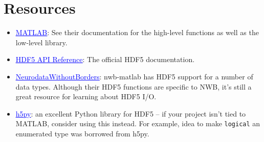 \documentclass[11pt]{exam}
\newcommand\myurl[1]{\textcolor{blue}{\underline{#1}}}
\begin{document}
    \section{Resources}
    \begin{itemize}
        \item \href{https://www.mathworks.com/help/matlab/hdf5-files.html}{\myurl{MATLAB}}: See their documentation for the high-level functions as well as the low-level library.
        \item \href{https://docs.hdfgroup.org/hdf5/develop/}{\myurl{HDF5 API Reference}}: The official HDF5 documentation. 
        \item \href{https://github.com/NeurodataWithoutBorders/matnwb}{\myurl{NeurodataWithoutBorders}}: nwb-matlab has HDF5 support for a number of data types. Although their HDF5 functions are specific to NWB, it's still a great resource for learning about HDF5 I/O. 
        \item \href{https://github.com/h5py/h5py}{\myurl{h5py}}: an excellent Python library for HDF5 -- if your project isn't tied to MATLAB, consider using this instead. For example, idea to make \texttt{logical} an enumerated type was borrowed from h5py. 
    \end{itemize}
\end{document}

